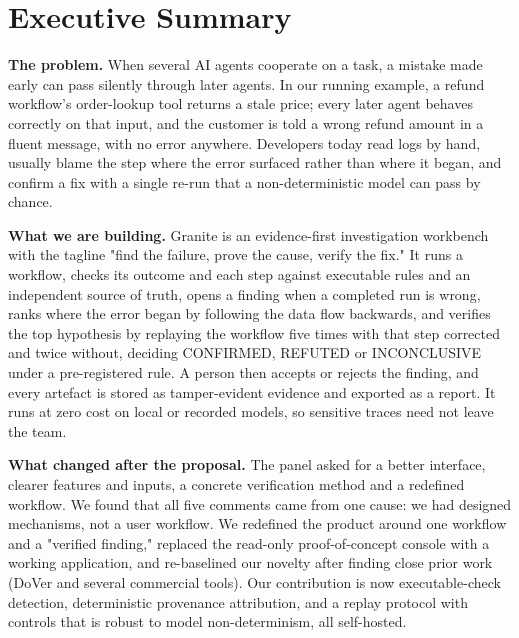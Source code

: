 \documentclass{fast-nuces-bs}
\begin{document}
\chapter*{Executive Summary}
\sloppy%

\textbf{The problem.} When several AI agents cooperate on a task, a mistake made early can pass silently through later agents. In our running example, a refund workflow's order-lookup tool returns a stale price; every later agent behaves correctly on that input, and the customer is told a wrong refund amount in a fluent message, with no error anywhere. Developers today read logs by hand, usually blame the step where the error surfaced rather than where it began, and confirm a fix with a single re-run that a non-deterministic model can pass by chance.

\textbf{What we are building.} Granite is an evidence-first investigation workbench with the tagline "find the failure, prove the cause, verify the fix." It runs a workflow, checks its outcome and each step against executable rules and an independent source of truth, opens a finding when a completed run is wrong, ranks where the error began by following the data flow backwards, and verifies the top hypothesis by replaying the workflow five times with that step corrected and twice without, deciding CONFIRMED, REFUTED or INCONCLUSIVE under a pre-registered rule. A person then accepts or rejects the finding, and every artefact is stored as tamper-evident evidence and exported as a report. It runs at zero cost on local or recorded models, so sensitive traces need not leave the team.

\textbf{What changed after the proposal.} The panel asked for a better interface, clearer features and inputs, a concrete verification method and a redefined workflow. We found that all five comments came from one cause: we had designed mechanisms, not a user workflow. We redefined the product around one workflow and a "verified finding," replaced the read-only proof-of-concept console with a working application, and re-baselined our novelty after finding close prior work (DoVer and several commercial tools). Our contribution is now executable-check detection, deterministic provenance attribution, and a replay protocol with controls that is robust to model non-determinism, all self-hosted.
\end{document}
